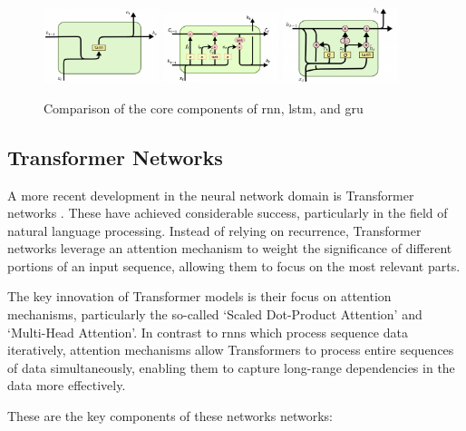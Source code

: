\begin{figure}[H]
    \includegraphics[width=0.3\textwidth]{files/RNN_Core2-768x491.png}
    \includegraphics[width=0.3\textwidth]{files/LSTM-Core-768x466.png}
    \includegraphics[width=0.3\textwidth]{files/GRU-768x502.png}
    \caption{Comparison of the core components of \gls{rnn}, \gls{lstm}, and \gls{gru} \cite{http://dprogrammer.org}}
\end{figure}

\subsection{Transformer Networks}

A more recent development in the neural network domain is Transformer networks
\cite{attention:2017}. These have achieved considerable success, particularly
in the field of natural language processing. Instead of relying on recurrence,
Transformer networks leverage an attention mechanism to weight the significance
of different portions of an input sequence, allowing them to focus on the most
relevant parts.

The key innovation of Transformer models is their focus on attention
mechanisms, particularly the so-called `Scaled Dot-Product Attention' and
`Multi-Head Attention'. In contrast to \glspl{rnn} which process sequence data
iteratively, attention mechanisms allow Transformers to process entire
sequences of data simultaneously, enabling them to capture long-range
dependencies in the data more effectively.

These are the key components of these networks networks:

